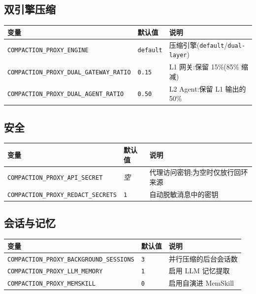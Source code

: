 \documentclass[11pt,a4paper]{article}
\begin{document}
\subsection{双引擎压缩}

\begin{longtable}{@{}llp{7cm}@{}}
  \toprule
  变量 & 默认值 & 说明 \\
  \midrule
  \texttt{COMPACTION\_PROXY\_ENGINE} & \texttt{default} & 压缩引擎(\texttt{default}/\texttt{dual-layer}) \\
  \texttt{COMPACTION\_PROXY\_DUAL\_GATEWAY\_RATIO} & \texttt{0.15} & L1 网关:保留 15\%(85\% 缩减) \\
  \texttt{COMPACTION\_PROXY\_DUAL\_AGENT\_RATIO} & \texttt{0.50} & L2 Agent:保留 L1 输出的 50\% \\
  \bottomrule
\end{longtable}

\subsection{安全}

\begin{longtable}{@{}llp{7cm}@{}}
  \toprule
  变量 & 默认值 & 说明 \\
  \midrule
  \texttt{COMPACTION\_PROXY\_API\_SECRET} & \textit{空} & 代理访问密钥;为空时仅放行回环来源 \\
  \texttt{COMPACTION\_PROXY\_REDACT\_SECRETS} & \texttt{1} & 自动脱敏消息中的密钥 \\
  \bottomrule
\end{longtable}

\subsection{会话与记忆}

\begin{longtable}{@{}llp{7cm}@{}}
  \toprule
  变量 & 默认值 & 说明 \\
  \midrule
  \texttt{COMPACTION\_PROXY\_BACKGROUND\_SESSIONS} & \texttt{3} & 并行压缩的后台会话数 \\
  \texttt{COMPACTION\_PROXY\_LLM\_MEMORY} & \texttt{1} & 启用 LLM 记忆提取 \\
  \texttt{COMPACTION\_PROXY\_MEMSKILL} & \texttt{0} & 启用自演进 MemSkill \\
  \bottomrule
\end{longtable}

\end{document}
